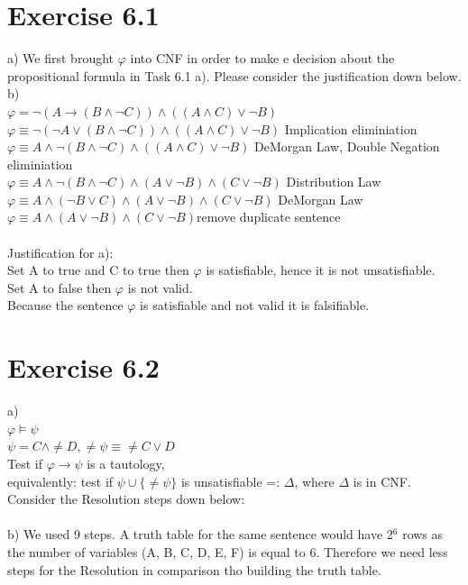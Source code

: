 \documentclass[12pt]{article}
\begin{document}
\section*{Exercise 6.1}
a) We first brought $\varphi$ into CNF in order to make e decision about the propositional formula in Task 6.1 a). Please consider the justification down below.\\
b) \\
$\varphi = \lnot (A \to (B \land \lnot C)) \land ((A \land C ) \lor \lnot B)$\\
$\varphi \equiv \lnot (\lnot A \lor (B \land \lnot C)) \land ((A \land C) \lor \lnot B)$ \qquad Implication eliminiation\\
$\varphi \equiv A \land \lnot (B \land \lnot C) \land ((A \land C) \lor \lnot B)$ \qquad DeMorgan Law, Double Negation eliminiation\\
$\varphi \equiv A \land \lnot (B \land \lnot C) \land (A \lor \lnot B) \land (C \lor \lnot B)$ \qquad Distribution Law\\
$\varphi \equiv A \land (\lnot B \lor C) \land (A \lor \lnot B) \land (C \lor \lnot B)$ \qquad DeMorgan Law\\
$\varphi \equiv A \land (A \lor \lnot B) \land (C \lor \lnot B)$\qquad remove duplicate sentence\\ \\
Justification for a):\\
Set A to true and C to true then $\varphi$ is satisfiable, hence it is not unsatisfiable.\\
Set A to false then $\varphi$ is not valid.\\
Because the sentence $\varphi$ is satisfiable and not valid it is falsifiable.


\section*{Exercise 6.2}
a)\\
$\varphi \vDash \psi$\\
$\psi = C \land \neq D, \neq \psi \equiv \neq C \lor D$\\
Test if $\varphi \to \psi$ is a tautology,\\
equivalently: test if $\psi \cup \{\neq \psi \}$ is unsatisfiable =: $\Delta$, where $\Delta$ is in CNF.\\
Consider the Resolution steps down below:\\ \\
b) We used 9 steps. A truth table for the same sentence would have 2$^6$ rows as the number of variables (A, B, C, D, E, F) is equal to 6. Therefore we need less steps for the Resolution in comparison tho building the truth table.\\
\end{document}
